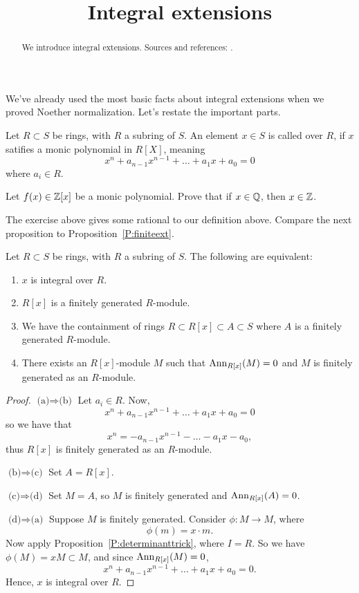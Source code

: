 \documentclass{ximera}
\title{Integral extensions}
\begin{document}
\begin{abstract}
  We introduce integral extensions. Sources and references:
  \cite{AM1969}.
\end{abstract}
\maketitle


We've already used the most basic facts about integral extensions when
we proved Noether normalization. Let's restate the important parts.
\begin{definition}
  Let $R\subset S$ be rings, with $R$ a subring of $S$. An element
  $x\in S$ is called  over $R$, if $x$ satifies a monic
  polynomial in $R[X]$, meaning
  \[
  x^n + a_{n-1} x^{n-1} + \dots + a_1 x + a_0  = 0
  \]
  where $a_i\in R$.
\end{definition}

\begin{exercise}
  Let $f(x)\in\mathbb Z[x]$ be a monic polynomial. Prove that if $x\in\mathbb Q$,
  then $x\in\mathbb Z$.
\end{exercise}

The exercise above gives some rational to our definition
above. Compare the next proposition to Proposition~\ref{P:finiteext}.

\begin{proposition}
  Let $R\subset S$ be rings, with $R$ a subring of $S$. The following are equivalent:
  \begin{enumerate}
  \item $x$ is integral over $R$.
  \item $R[x]$ is a finitely generated $R$-module.
  \item We have the containment of rings $R\subset R[x] \subset
    A\subset S$ where $A$ is a finitely generated $R$-module.
  \item There exists an $R[x]$-module $M$ such that $\operatorname{Ann}_{R[x]}(M) =
    0$ and $M$ is finitely generated as an $R$-module.
  \end{enumerate}
  \begin{proof}
    $\text{(a)}\Rightarrow \text{(b)}$ Let $a_i\in R$. Now, 
    \[
    x^n + a_{n-1} x^{n-1} + \dots + a_1 x + a_0  = 0
    \]
    so we have that
    \[
    x^n = - a_{n-1} x^{n-1} - \dots - a_1 x - a_0,
    \] 
    thus $R[x]$ is finitely generated as an $R$-module.

    
    $\text{(b)}\Rightarrow \text{(c)}$ Set $A=R[x]$.


    $\text{(c)}\Rightarrow \text{(d)}$ Set $M=A$, so $M$ is finitely
    generated and $\operatorname{Ann}_{R[x]}(A)=0$.


    $\text{(d)}\Rightarrow \text{(a)}$ Suppose $M$ is finitely
    generated. Consider $\phi:M \to M$, where
    \[
    \phi(m) = x\cdot m.
    \]
    Now apply Proposition~\ref{P:determinanttrick}, where $I= R$. So
    we have $\phi(M) = xM \subset M$, and since $\operatorname{Ann}_{R[x]}(M) = 0$,
    \[
    x^n+ a_{n-1}x^{n-1} + \dots + a_1 x  + a_0 = 0.
    \]
    Hence, $x$ is integral over $R$.
  \end{proof}
\end{proposition}
\end{document}
